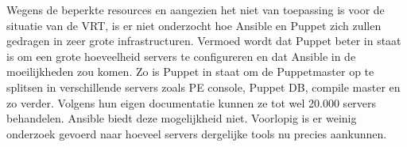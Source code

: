 Wegens de beperkte resources en aangezien het niet van toepassing is voor de situatie van de VRT, is er niet onderzocht hoe Ansible en Puppet zich zullen gedragen in zeer grote infrastructuren. Vermoed wordt dat Puppet beter in staat is om een grote hoeveelheid servers te configureren en dat Ansible in de moeilijkheden zou komen. Zo is Puppet in staat om de Puppetmaster op te splitsen in verschillende servers zoals PE console, Puppet DB, compile master en zo verder. Volgens hun eigen documentatie kunnen ze tot wel 20.000 servers behandelen. Ansible biedt deze mogelijkheid niet. Voorlopig is er weinig onderzoek gevoerd naar hoeveel servers dergelijke tools nu precies aankunnen. 